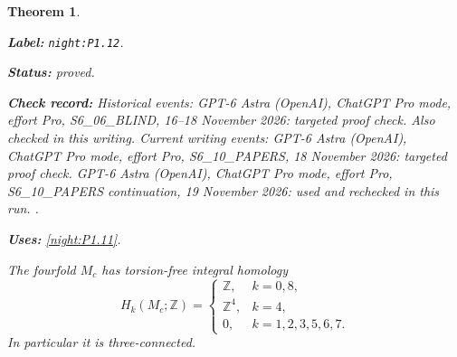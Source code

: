 \documentclass[11pt,a4paper]{article}
\newtheorem{theorem}{Theorem}[section]
\theoremstyle{definition}
\newcommand{\StatementRecord}[4]{\par\smallskip\begingroup\upshape\raggedright\noindent\textbf{Label:} \nolinkurl{#1}.\par\noindent\textbf{Status:} #2.\par\noindent\textbf{Check record:} #3.\par\noindent\textbf{Uses:} #4.\par\endgroup\smallskip}
\begin{document}
\begin{theorem}\label{night:P1.12}
\StatementRecord{night:P1.12}{proved}{Historical events: GPT-6 Astra (OpenAI), ChatGPT Pro mode, effort Pro, S6\_06\_BLIND, 16--18 November 2026: targeted proof check. Also checked in this writing. Current writing events: GPT-6 Astra (OpenAI), ChatGPT Pro mode, effort Pro, S6\_10\_PAPERS, 18 November 2026: targeted proof check. GPT-6 Astra (OpenAI), ChatGPT Pro mode, effort Pro, S6\_10\_PAPERS continuation, 19 November 2026: used and rechecked in this run. }{\cref{night:P1.11}}
The fourfold $M_c$ has torsion-free integral homology
\[
H_k(M_c;\mathbb Z)=
\begin{cases}
\mathbb Z,&k=0,8,\\
\mathbb Z^4,&k=4,\\
0,&k=1,2,3,5,6,7.
\end{cases}
\]
In particular it is three-connected.
\end{theorem}
\end{document}
